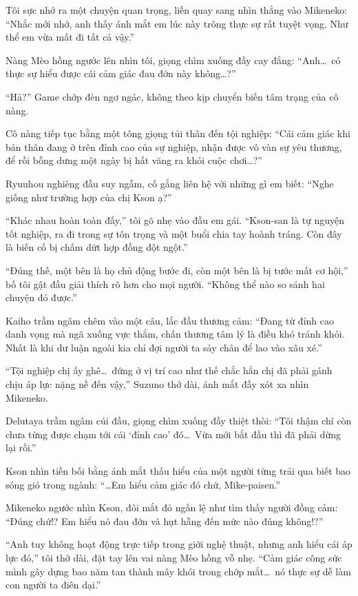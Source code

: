 ﻿\documentclass[../main.tex]{subfiles}
\begin{document}
Tôi sực nhớ ra một chuyện quan trọng, liền quay sang nhìn thẳng vào Mikeneko: ``Nhắc mới nhớ, anh thấy ánh mắt em lúc này trông thực sự rất tuyệt vọng. Như thể em vừa mất đi tất cả vậy.''

Nàng Mèo hồng ngước lên nhìn tôi, giọng chìm xuống đầy cay đắng: ``Anh\dots\ có thực sự hiểu được cái cảm giác đau đớn này không\dots?''

``Hả?'' Game chớp đèn ngơ ngác, không theo kịp chuyển biến tâm trạng của cô nàng.

Cô nàng tiếp tục bằng một tông giọng tủi thân đến tội nghiệp: ``Cái cảm giác khi bản thân đang ở trên đỉnh cao của sự nghiệp, nhận được vô vàn sự yêu thương, để rồi bỗng dưng một ngày bị hất văng ra khỏi cuộc chơi\dots?''

Ryuuhou nghiêng đầu suy ngẫm, cố gắng liên hệ với những gì em biết: ``Nghe giống như trường hợp của chị Kson ạ?''

``Khác nhau hoàn toàn đấy,'' tôi gõ nhẹ vào đầu em gái. ``Kson-san là tự nguyện tốt nghiệp, ra đi trong sự tôn trọng và một buổi chia tay hoành tráng. Còn đây là biến cố bị chấm dứt hợp đồng đột ngột.''

``Đúng thế, một bên là họ chủ động bước đi, còn một bên là bị tước mất cơ hội,'' bố tôi gật đầu giải thích rõ hơn cho mọi người. ``Không thể nào so sánh hai chuyện đó được.''

Kaiho trầm ngâm chêm vào một câu, lắc đầu thương cảm: ``Đang từ đỉnh cao danh vọng mà ngã xuống vực thẳm, chấn thương tâm lý là điều khó tránh khỏi. Nhất là khi dư luận ngoài kia chỉ đợi người ta sảy chân để lao vào xâu xé.''

``Tội nghiệp chị ấy ghê\dots\ đứng ở vị trí cao như thế chắc hẳn chị đã phải gánh chịu áp lực nặng nề đến vậy,'' Suzuno thở dài, ánh mắt đầy xót xa nhìn Mikeneko.

Delutaya trầm ngâm cúi đầu, giọng chìm xuống đầy thiệt thòi: ``Tôi thậm chí còn chưa từng được chạm tới cái `đỉnh cao' đó\dots\ Vừa mới bắt đầu thì đã phải dừng lại rồi.''

Kson nhìn tiền bối bằng ánh mắt thấu hiểu của một người từng trải qua biết bao sóng gió trong ngành: ``\dots Em hiểu cảm giác đó chứ, Mike-paisen.''

Mikeneko ngước nhìn Kson, đôi mắt đỏ ngấn lệ như tìm thấy người đồng cảm: ``Đúng chứ!? Em hiểu nó đau đớn và hụt hẫng đến mức nào đúng không!?''

``Anh tuy không hoạt động trực tiếp trong giới nghệ thuật, nhưng anh hiểu cái áp lực đó,'' tôi thở dài, đặt tay lên vai nàng Mèo hồng vỗ nhẹ. ``Cảm giác công sức mình gây dựng bao năm tan thành mây khói trong chớp mắt\dots\ nó thực sự dễ làm con người ta điên dại.''
\end{document}
